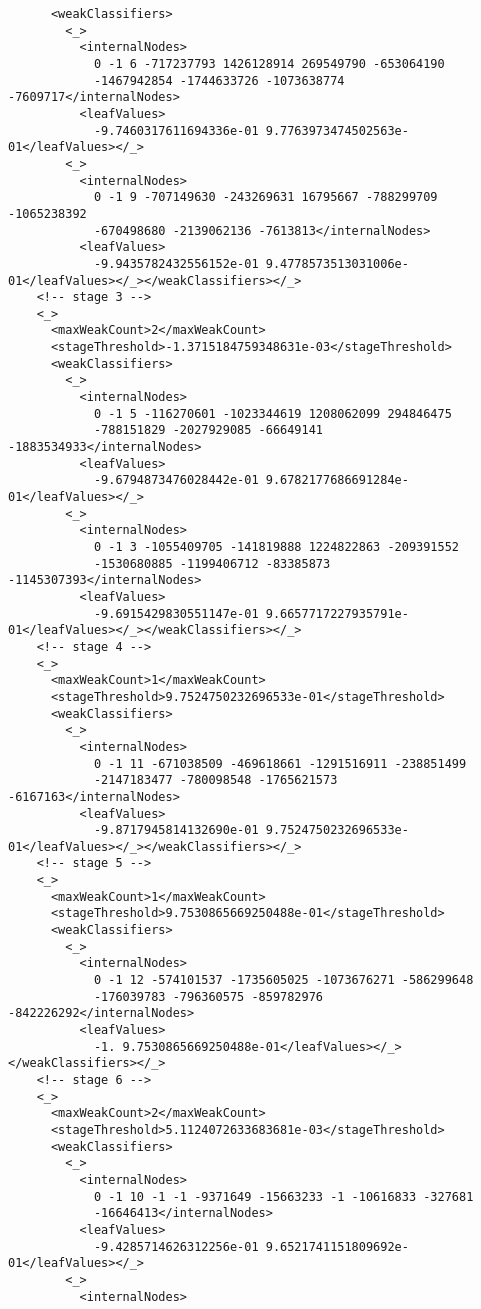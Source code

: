 \begin{lstlisting}
      <weakClassifiers>
        <_>
          <internalNodes>
            0 -1 6 -717237793 1426128914 269549790 -653064190
            -1467942854 -1744633726 -1073638774 -7609717</internalNodes>
          <leafValues>
            -9.7460317611694336e-01 9.7763973474502563e-01</leafValues></_>
        <_>
          <internalNodes>
            0 -1 9 -707149630 -243269631 16795667 -788299709 -1065238392
            -670498680 -2139062136 -7613813</internalNodes>
          <leafValues>
            -9.9435782432556152e-01 9.4778573513031006e-01</leafValues></_></weakClassifiers></_>
    <!-- stage 3 -->
    <_>
      <maxWeakCount>2</maxWeakCount>
      <stageThreshold>-1.3715184759348631e-03</stageThreshold>
      <weakClassifiers>
        <_>
          <internalNodes>
            0 -1 5 -116270601 -1023344619 1208062099 294846475
            -788151829 -2027929085 -66649141 -1883534933</internalNodes>
          <leafValues>
            -9.6794873476028442e-01 9.6782177686691284e-01</leafValues></_>
        <_>
          <internalNodes>
            0 -1 3 -1055409705 -141819888 1224822863 -209391552
            -1530680885 -1199406712 -83385873 -1145307393</internalNodes>
          <leafValues>
            -9.6915429830551147e-01 9.6657717227935791e-01</leafValues></_></weakClassifiers></_>
    <!-- stage 4 -->
    <_>
      <maxWeakCount>1</maxWeakCount>
      <stageThreshold>9.7524750232696533e-01</stageThreshold>
      <weakClassifiers>
        <_>
          <internalNodes>
            0 -1 11 -671038509 -469618661 -1291516911 -238851499
            -2147183477 -780098548 -1765621573 -6167163</internalNodes>
          <leafValues>
            -9.8717945814132690e-01 9.7524750232696533e-01</leafValues></_></weakClassifiers></_>
    <!-- stage 5 -->
    <_>
      <maxWeakCount>1</maxWeakCount>
      <stageThreshold>9.7530865669250488e-01</stageThreshold>
      <weakClassifiers>
        <_>
          <internalNodes>
            0 -1 12 -574101537 -1735605025 -1073676271 -586299648
            -176039783 -796360575 -859782976 -842226292</internalNodes>
          <leafValues>
            -1. 9.7530865669250488e-01</leafValues></_></weakClassifiers></_>
    <!-- stage 6 -->
    <_>
      <maxWeakCount>2</maxWeakCount>
      <stageThreshold>5.1124072633683681e-03</stageThreshold>
      <weakClassifiers>
        <_>
          <internalNodes>
            0 -1 10 -1 -1 -9371649 -15663233 -1 -10616833 -327681
            -16646413</internalNodes>
          <leafValues>
            -9.4285714626312256e-01 9.6521741151809692e-01</leafValues></_>
        <_>
          <internalNodes>

\end{lstlisting}

